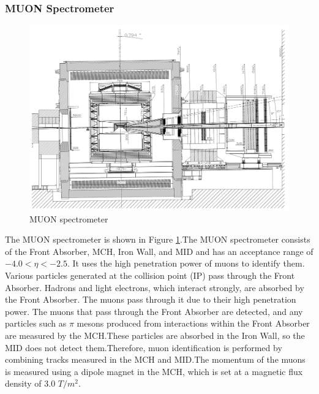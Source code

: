         \subsubsection{MUON Spectrometer}
            \begin{figure}
                \centering
                \includegraphics[keepaspectratio, scale=0.25]{fig/2_2_MUONspectrometer.png}
                \caption{MUON spectrometer}
                \label{MUONspectrometer}
            \end{figure}
            The MUON spectrometer is shown in Figure \ref{MUONspectrometer}\cite{Muon_TDR}.The MUON spectrometer consists of the Front Absorber, MCH, Iron Wall, and MID and has an acceptance range of $-4.0 < \eta < -2.5$. It uses the high penetration power of muons to identify them. Various particles generated at the collision point (IP) pass through the Front Absorber. Hadrons and light electrons, which interact strongly, are absorbed by the Front Absorber. The muons pass through it due to their high penetration power. The muons that pass through the Front Absorber are detected, and any particles such as $\pi$ mesons produced from interactions within the Front Absorber are measured by the MCH.\@ These particles are absorbed in the Iron Wall, so the MID does not detect them.\@ Therefore, muon identification is performed by combining tracks measured in the MCH and MID.\@ The momentum of the muons is measured using a dipole magnet in the MCH, which is set at a magnetic flux density of 3.0 $T/m^2$.\@
